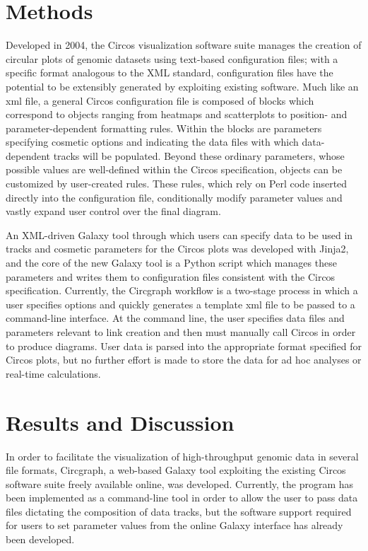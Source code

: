 \documentclass{article}
\begin{document}
\section*{Methods}
Developed in 2004, the Circos visualization software suite manages the creation of circular plots of genomic datasets using text-based configuration files; with a specific format analogous to the XML standard, configuration files have the potential to be extensibly generated by exploiting existing software. Much like an xml file, a general Circos configuration file is composed of blocks which correspond to objects ranging from heatmaps and scatterplots to position- and parameter-dependent formatting rules. Within the blocks are parameters specifying cosmetic options and indicating the data files with which data-dependent tracks will be populated. Beyond these ordinary parameters, whose possible values are well-defined within the Circos specification, objects can be customized by user-created rules. These rules, which rely on Perl code inserted directly into the configuration file, conditionally modify parameter values and vastly expand user control over the final diagram.  

An XML-driven Galaxy tool through which users can specify data to be used in tracks and cosmetic parameters for the Circos plots was developed with Jinja2, and the core of the new Galaxy tool is a Python script which manages these parameters and writes them to configuration files consistent with the Circos specification. Currently, the Circgraph workflow is a two-stage process in which a user specifies options and quickly generates a template xml file to be passed to a command-line interface. At the command line, the user specifies data files and parameters relevant to link creation and then must manually call Circos in order to produce diagrams. User data is parsed into the appropriate format specified for Circos plots, but no further effort is made to store the data for ad hoc analyses or real-time calculations.

\section*{Results and Discussion}

In order to facilitate the visualization of high-throughput genomic data in several file formats, Circgraph, a web-based Galaxy tool exploiting the existing Circos software suite freely available online, was developed. Currently, the program has been implemented as a command-line tool in order to allow the user to pass data files dictating the composition of data tracks, but the software support required for users to set parameter values from the online Galaxy interface has already been developed.
\end{document}
